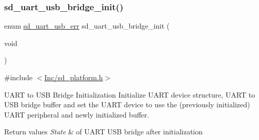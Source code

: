 \subsubsection{\texorpdfstring{sd\+\_\+uart\+\_\+usb\+\_\+bridge\+\_\+init()}{sd\_uart\_usb\_bridge\_init()}}
{\footnotesize\ttfamily enum \mbox{\hyperlink{group___s_d___u_a_r_t___u_s_b___bridge___types_ga7e4773a8cce69fafe541cad55985f146}{sd\+\_\+uart\+\_\+usb\+\_\+err}} sd\+\_\+uart\+\_\+usb\+\_\+bridge\+\_\+init (\begin{DoxyParamCaption}\item[{void}]{ }\end{DoxyParamCaption})}



{\ttfamily \#include $<$\mbox{\hyperlink{sd__platform_8h}{Inc/sd\+\_\+platform.\+h}}$>$}



U\+A\+RT to U\+SB Bridge Initialization Initialize U\+A\+RT device structure, U\+A\+RT to U\+SB bridge buffer and set the U\+A\+RT device to use the (previously initialized) U\+A\+RT peripheral and newly initialized buffer. 


\begin{DoxyRetVals}{Return values}
{\em State} & of U\+A\+RT U\+SB bridge after initialization \\
\hline
\end{DoxyRetVals}

